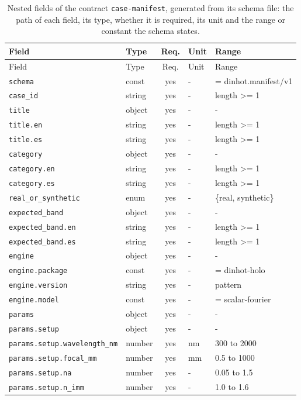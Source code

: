 \begingroup\scriptsize
\begin{longtable}{@{}l l c l l@{}}
\caption{Nested fields of the contract \texttt{case-manifest}, generated from its schema file: the path of each field, its type, whether it is required, its unit and the range or constant the schema states.}\label{tab:fields-case-manifest}\\
\toprule Field & Type & Req. & Unit & Range\\\midrule\endfirsthead
\toprule Field & Type & Req. & Unit & Range\\\midrule\endhead
\texttt{schema} & const & yes & - & = dinhot.manifest/v1\\
\texttt{case\_id} & string & yes & - & length >= 1\\
\texttt{title} & object & yes & - & -\\
\texttt{title.en} & string & yes & - & length >= 1\\
\texttt{title.es} & string & yes & - & length >= 1\\
\texttt{category} & object & yes & - & -\\
\texttt{category.en} & string & yes & - & length >= 1\\
\texttt{category.es} & string & yes & - & length >= 1\\
\texttt{real\_or\_synthetic} & enum & yes & - & \{real, synthetic\}\\
\texttt{expected\_band} & object & yes & - & -\\
\texttt{expected\_band.en} & string & yes & - & length >= 1\\
\texttt{expected\_band.es} & string & yes & - & length >= 1\\
\texttt{engine} & object & yes & - & -\\
\texttt{engine.package} & const & yes & - & = dinhot-holo\\
\texttt{engine.version} & string & yes & - & pattern\\
\texttt{engine.model} & const & yes & - & = scalar-fourier\\
\texttt{params} & object & yes & - & -\\
\texttt{params.setup} & object & yes & - & -\\
\texttt{params.setup.wavelength\_nm} & number & yes & nm & 300 to 2000\\
\texttt{params.setup.focal\_mm} & number & yes & mm & 0.5 to 1000\\
\texttt{params.setup.na} & number & yes & - & 0.05 to 1.5\\
\texttt{params.setup.n\_imm} & number & yes & - & 1.0 to 1.6\\

\end{longtable}
